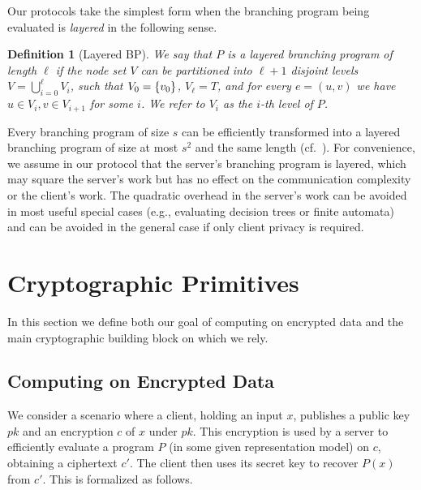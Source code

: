 \documentclass[11pt]{article}
\newtheorem{definition}[theorem]{Definition}
\newcommand\bp{\mbox{BP}\xspace}
\newcommand\ot{\mbox{OT}\xspace}
\newcommand{\mathify}[1]{\ifmmode{#1}\else\mbox{$#1$}\fi}
\newcommand{\set}[2][]{\mathify{{\left\{#2\right\}}^{#1}}}
\begin{document}
Our protocols take the simplest form when the branching program
being evaluated is {\em layered} in the following sense.

\begin{definition}[Layered \bp]
\label{def-layered} We say that $P$ is a {\em layered} branching
program of length $\ell$ if the node set $V$ can be partitioned
into $\ell+1$ disjoint levels $V=\bigcup_{i=0}^{\ell}V_i$, such
that $V_0=\set{v_0}$, $V_\ell=T$, and for every $e=(u,v)$ we have
$u\in{V_i},v\in{V_{i+1}}$ for some $i$. We refer to $V_i$ as {\em
the $i$-th level} of $P$.
\end{definition}

Every branching program of size $s$ can be efficiently transformed
into a layered branching program of size at most $s^2$ and the same
length (cf.~\cite{Pip79}). For convenience, we assume in our
protocol that the server's branching program is layered, which may
square the server's work but has no effect on the communication
complexity or the client's work. The quadratic overhead in the
server's work can be avoided in most useful special cases (e.g.,
evaluating decision trees or finite automata) and can be avoided in
the general case if only client privacy is required.


\section{Cryptographic Primitives} \label{sec-cryptodefs}

In this section we define both our goal of computing on encrypted
data and the main cryptographic building block on which we rely.

\subsection{Computing on Encrypted Data} \label{sec-clientserver}

We consider a scenario where a client, holding an input $x$,
publishes a public key $pk$ and an encryption $c$ of $x$ under $pk$.
This encryption is used by a server to efficiently evaluate a
program $P$ (in some given representation model) on $c$, obtaining a
ciphertext $c'$. The client then uses its secret key to recover
$P(x)$ from $c'$. This is formalized as follows.
\end{document}

